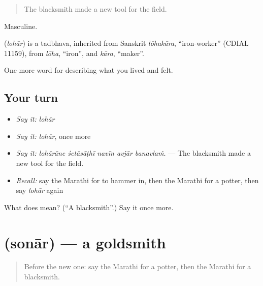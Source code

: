 \begin{quote}
The blacksmith made a new tool for the field.
\end{quote}

Masculine.

\begin{cousinweb}
\textbf{} (\emph{lohār}) is a tadbhava, inherited from Sanskrit \emph{lōhakāra}, \textquotedblleft{}iron-worker\textquotedblright{} (CDIAL 11159), from \emph{lōha}, \textquotedblleft{}iron\textquotedblright{}, and \emph{kāra}, \textquotedblleft{}maker\textquotedblright{}.
\end{cousinweb}

\begin{grammarlens}[title={What you've built}]
One more word for describing what you lived and felt.
\end{grammarlens}

\subsection*{Your turn}
\begin{itemize}
\raggedright
  \item \emph{Say it:} \emph{lohār}
  \item \emph{Say it:} \emph{lohār}, once more
  \item \emph{Say it:} \emph{lohārāne śetāsāṭhī navīn avjār banavlaṁ.} — The blacksmith made a new tool for the field.
  \item \emph{Recall:} say the Marathi for to hammer in, then the Marathi for a potter, then say \emph{lohār} again
\end{itemize}

\begin{tcolorbox}[breakable,colback=teal!4,colframe=teal!35!black,title={Before you move on}]
What does  mean? (\textquotedblleft{}A blacksmith\textquotedblright{}.) Say it once more.
\end{tcolorbox}
\section[\texorpdfstring{\mr{सोनार} (sonār)}{सोनार (sonār)}]{ (sonār) — a goldsmith}

\label{lesson:MR-C505-sonar}



\begin{quote}
Before the new one: say the Marathi for a potter, then the Marathi for a blacksmith.
\end{quote}

